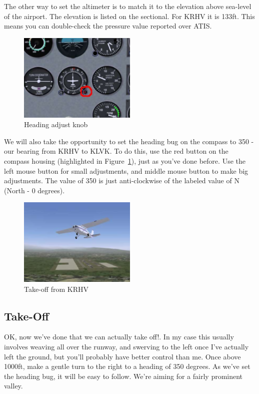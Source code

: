 The other way to set the altimeter is to match it to the elevation above
sea-level of the airport. The elevation is listed on the sectional.
For KRHV it is 133ft. This means you can double-check the pressure value reported over ATIS.

\begin{figure}[!htp]
\centering
\includegraphics[width=0.5\textwidth]{compass}
\caption{Heading adjust knob\label{head}}
\end{figure}

We will also take the opportunity to set the heading bug on the compass to 350 -
our bearing from KRHV to KLVK. To do this, use the red button on the compass
housing (highlighted in Figure~\ref{head}), just as you've done before.
Use the left mouse button for small adjustments, and middle mouse button
to make big adjustments. The value of 350 is just anti-clockwise of the
labeled value of N (North - 0 degrees).

\begin{figure}[!htp]
\centering
\includegraphics[width=0.5\textwidth]{takeoff}
\caption{Take-off from KRHV}
\end{figure}

\subsection{Take-Off}

OK, now we've done that we can actually take off!. In my case this usually
involves weaving all over the runway, and swerving to the left once
I've actually left the ground, but you'll probably have better control than me.
Once above 1000ft, make a gentle turn to the right to a heading of 350 degrees.
As we've set the heading bug, it will be easy to follow. We're aiming for a fairly prominent valley.



